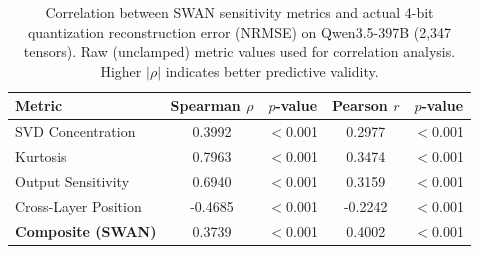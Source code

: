 \begin{table}[t]
\centering
\caption{Correlation between SWAN sensitivity metrics and actual 4-bit quantization reconstruction error (NRMSE) on Qwen3.5-397B (2,347 tensors). Raw (unclamped) metric values used for correlation analysis. Higher $|\rho|$ indicates better predictive validity.}
\label{tab:correlation}
\begin{tabular}{lcccc}
\toprule
Metric & Spearman $\rho$ & $p$-value & Pearson $r$ & $p$-value \\
\midrule
  SVD Concentration & 0.3992 & $<$0.001 & 0.2977 & $<$0.001 \\
  Kurtosis & 0.7963 & $<$0.001 & 0.3474 & $<$0.001 \\
  Output Sensitivity & 0.6940 & $<$0.001 & 0.3159 & $<$0.001 \\
  Cross-Layer Position & -0.4685 & $<$0.001 & -0.2242 & $<$0.001 \\
\midrule
  \textbf{Composite (SWAN)} & 0.3739 & $<$0.001 & 0.4002 & $<$0.001 \\
\bottomrule
\end{tabular}
\end{table}